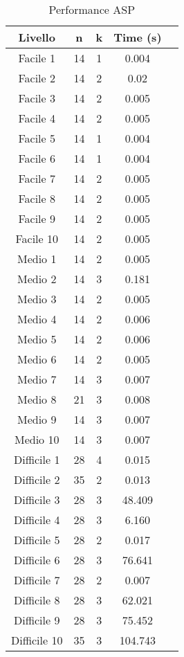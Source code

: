 \documentclass{article}
\begin{document}
\begin{multicols*}{2}
\begin{table}[H]
    \centering
    \caption{Performance ASP}\label{tab:ASP}
    \begin{tabular}{|c|c|c|c|c|}
        \hline
        \textbf{Livello} & \textbf{n} & \textbf{k} & \textbf{Time (s)} \\
        \hline
        Facile 1 & 14 & 1 & 0.004 \\
        Facile 2 & 14 & 2 & 0.02 \\
        Facile 3 & 14 & 2 & 0.005 \\
        Facile 4 & 14 & 2 & 0.005 \\
        Facile 5 & 14 & 1 & 0.004 \\
        Facile 6 & 14 & 1 & 0.004 \\
        Facile 7 & 14 & 2 & 0.005 \\
        Facile 8 & 14 & 2 & 0.005 \\
        Facile 9 & 14 & 2 & 0.005 \\
        Facile 10 & 14 & 2 & 0.005 \\
        \hline
        Medio 1 & 14 & 2 & 0.005 \\
        Medio 2 & 14 & 3 & 0.181 \\
        Medio 3 & 14 & 2 & 0.005 \\
        Medio 4 & 14 & 2 & 0.006 \\
        Medio 5 & 14 & 2 & 0.006 \\
        Medio 6 & 14 & 2 & 0.005 \\
        Medio 7 & 14 & 3 & 0.007 \\
        Medio 8 & 21 & 3 & 0.008\\
        Medio 9 & 14 & 3 & 0.007 \\
        Medio 10 & 14 & 3 & 0.007 \\
        \hline
        Difficile 1 & 28 & 4 & 0.015 \\
        Difficile 2 & 35 & 2 & 0.013 \\
        Difficile 3 & 28 & 3 & 48.409 \\
        Difficile 4 & 28 & 3 & 6.160 \\
        Difficile 5 & 28 & 2 & 0.017 \\
        Difficile 6 & 28 & 3 & 76.641 \\
        Difficile 7 & 28 & 2 & 0.007\\
        Difficile 8 & 28 & 3 & 62.021\\
        Difficile 9 & 28 & 3 & 75.452\\
        Difficile 10 & 35 & 3 & 104.743 \\
        \hline
    \end{tabular}
\end{table}



\end{multicols*}
\end{document}
